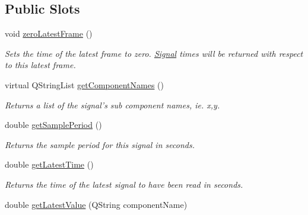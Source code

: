 \subsection*{Public Slots}
\begin{DoxyCompactItemize}
\item 
\hypertarget{class_picto_1_1_analysis_signal_data_a30afa4968fef68482bcf7435cef05027}{void \hyperlink{class_picto_1_1_analysis_signal_data_a30afa4968fef68482bcf7435cef05027}{zero\-Latest\-Frame} ()}\label{class_picto_1_1_analysis_signal_data_a30afa4968fef68482bcf7435cef05027}

\begin{DoxyCompactList}\small\item\em Sets the time of the latest frame to zero. \hyperlink{class_picto_1_1_signal}{Signal} times will be returned with respect to this latest frame. \end{DoxyCompactList}\item 
\hypertarget{class_picto_1_1_analysis_signal_data_af57ef0d6d246b5dc7f5d9b9419123181}{virtual Q\-String\-List \hyperlink{class_picto_1_1_analysis_signal_data_af57ef0d6d246b5dc7f5d9b9419123181}{get\-Component\-Names} ()}\label{class_picto_1_1_analysis_signal_data_af57ef0d6d246b5dc7f5d9b9419123181}

\begin{DoxyCompactList}\small\item\em Returns a list of the signal's sub component names, ie. x,y. \end{DoxyCompactList}\item 
\hypertarget{class_picto_1_1_analysis_signal_data_a7360089838df97bd35f33d5850f91f8c}{double \hyperlink{class_picto_1_1_analysis_signal_data_a7360089838df97bd35f33d5850f91f8c}{get\-Sample\-Period} ()}\label{class_picto_1_1_analysis_signal_data_a7360089838df97bd35f33d5850f91f8c}

\begin{DoxyCompactList}\small\item\em Returns the sample period for this signal in seconds. \end{DoxyCompactList}\item 
\hypertarget{class_picto_1_1_analysis_signal_data_a233df0a761fc0aff169e0b5844f22dfa}{double \hyperlink{class_picto_1_1_analysis_signal_data_a233df0a761fc0aff169e0b5844f22dfa}{get\-Latest\-Time} ()}\label{class_picto_1_1_analysis_signal_data_a233df0a761fc0aff169e0b5844f22dfa}

\begin{DoxyCompactList}\small\item\em Returns the time of the latest signal to have been read in seconds. \end{DoxyCompactList}\item 
\hypertarget{class_picto_1_1_analysis_signal_data_a0a8604618d6469d3bde2e7f7ba0c51ae}{double \hyperlink{class_picto_1_1_analysis_signal_data_a0a8604618d6469d3bde2e7f7ba0c51ae}{get\-Latest\-Value} (Q\-String component\-Name)}\label{class_picto_1_1_analysis_signal_data_a0a8604618d6469d3bde2e7f7ba0c51ae}


\end{DoxyCompactItemize}
